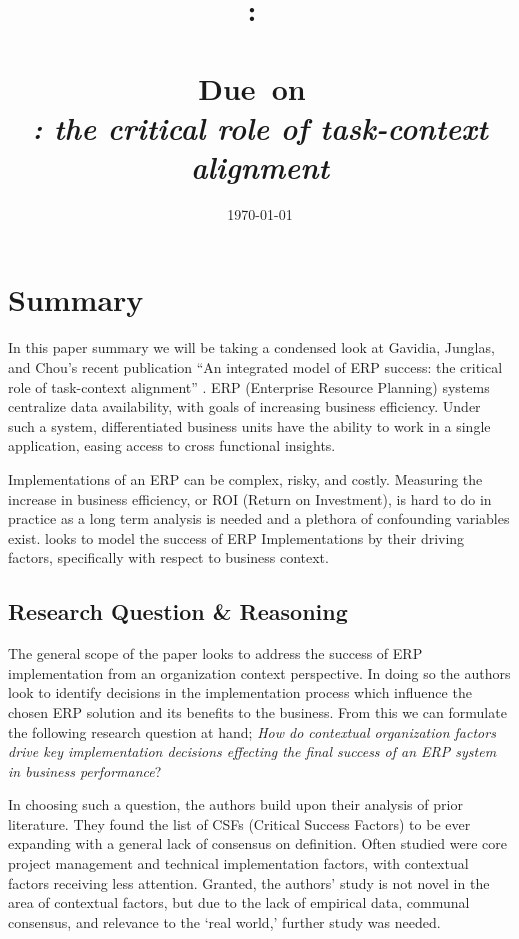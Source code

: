 \documentclass{article}
\title{
    \vspace{2in}
    \textmd{\textbf{\hmwkClass:\ \\ \hmwkTitle}}\\
    \normalsize\vspace{0.1in}\small{Due\ on\ \hmwkDueDate}\\
    \vspace{0.1in}\Large{\textit{\paprTitle: the critical role of task-context alignment}}
    \vspace{3in}
}
\author{\hmwkAuthorName}
\date{\today}
\begin{document}
\maketitle

\pagebreak

\tableofcontents
\listoffigures
\newpage

\section{Summary}
In this paper summary we will be taking a condensed look at Gavidia, Junglas, and Chou's recent publication ``An integrated model of ERP success: the critical role of task-context alignment'' \cite{integrated_erp}.
ERP (Enterprise Resource Planning) systems centralize data availability, with goals of increasing business efficiency.
Under such a system, differentiated business units have the ability to work in a single application, easing access to cross functional insights.

Implementations of an ERP can be complex, risky, and costly.
Measuring the increase in business efficiency, or ROI (Return on Investment), is hard to do in practice as a long term analysis is needed and a plethora of confounding variables exist.
\cite{integrated_erp} looks to model the success of ERP Implementations by their driving factors, specifically with respect to business context.

\subsection{Research Question \& Reasoning}
The general scope of the paper looks to address the success of ERP implementation from an organization context perspective.
In doing so the authors look to identify decisions in the implementation process which influence the chosen ERP solution and its benefits to the business.
From this we can formulate the following research question at hand; \emph{How do contextual organization factors drive key implementation decisions effecting the final success of an ERP system in business performance}?

In choosing such a question, the authors build upon their analysis of prior literature.
They found the list of CSFs (Critical Success Factors) to be ever expanding with a general lack of consensus on definition.
Often studied were core project management and technical implementation factors, with contextual factors receiving less attention.
Granted, the authors' study is not novel in the area of contextual factors, but due to the lack of empirical data, communal consensus, and relevance to the `real world,' further study was needed.
\end{document}
